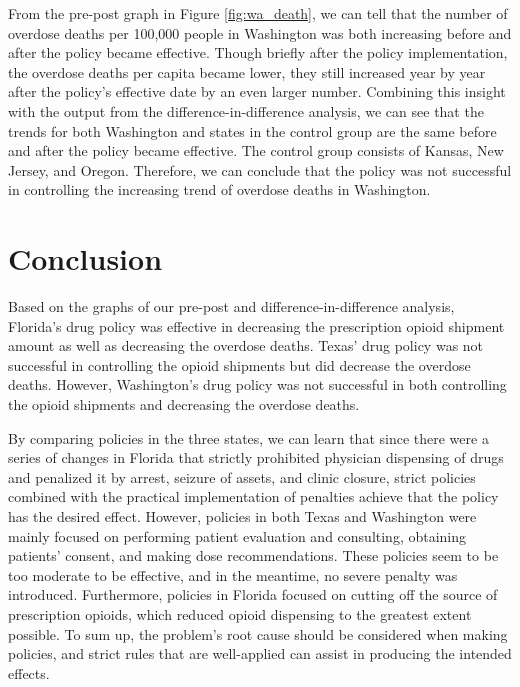 \documentclass[12pt,letterpaper]{article}
\begin{document}
From the pre-post graph in Figure \ref{fig:wa_death}, we can tell that the number of overdose deaths per 100,000 people in Washington was both increasing before and after the policy became effective. Though briefly after the policy implementation, the overdose deaths per capita became lower, they still increased year by year after the policy's effective date by an even larger number. Combining this insight with the output from the difference-in-difference analysis, we can see that the trends for both Washington and states in the control group are the same before and after the policy became effective. The control group consists of Kansas, New Jersey, and Oregon. Therefore, we can conclude that the policy was not successful in controlling the increasing trend of overdose deaths in Washington.


\section{Conclusion}

Based on the graphs of our pre-post and difference-in-difference analysis, Florida's drug policy was effective in decreasing the prescription opioid shipment amount as well as decreasing the overdose deaths. Texas' drug policy was not successful in controlling the opioid shipments but did decrease the overdose deaths. However, Washington's drug policy was not successful in both controlling the opioid shipments and decreasing the overdose deaths.

By comparing policies in the three states, we can learn that since there were a series of changes in Florida that strictly prohibited physician dispensing of drugs and penalized it by arrest, seizure of assets, and clinic closure, strict policies combined with the practical implementation of penalties achieve that the policy has the desired effect. However, policies in both Texas and Washington were mainly focused on performing patient evaluation and consulting, obtaining patients' consent, and making dose recommendations. These policies seem to be too moderate to be effective, and in the meantime, no severe penalty was introduced. Furthermore, policies in Florida focused on cutting off the source of prescription opioids, which reduced opioid dispensing to the greatest extent possible. To sum up, the problem's root cause should be considered when making policies, and strict rules that are well-applied can assist in producing the intended effects.
\end{document}

